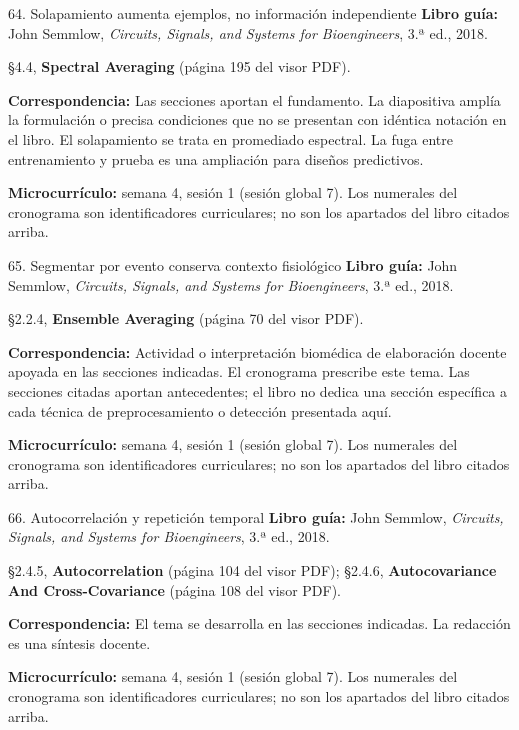 \documentclass[
  10pt,
  ignorenonframetext,
  aspectratio=169,
  spanish,
]{beamer}
\begin{document}
\begin{frame}{64. Solapamiento aumenta ejemplos, no información
independiente}
\label{solapamiento-aumenta-ejemplos-no-informaciuxf3n-independiente}
\textbf{Libro guía:} John Semmlow, \emph{Circuits, Signals, and Systems
for Bioengineers}, 3.ª ed., 2018.

§4.4, \textbf{Spectral Averaging} (página 195 del visor PDF).

\textbf{Correspondencia:} Las secciones aportan el fundamento. La
diapositiva amplía la formulación o precisa condiciones que no se
presentan con idéntica notación en el libro. El solapamiento se trata en
promediado espectral. La fuga entre entrenamiento y prueba es una
ampliación para diseños predictivos.

\textbf{Microcurrículo:} semana 4, sesión 1 (sesión global 7). Los
numerales del cronograma son identificadores curriculares; no son los
apartados del libro citados arriba.
\end{frame}

\begin{frame}{65. Segmentar por evento conserva contexto fisiológico}
\label{segmentar-por-evento-conserva-contexto-fisioluxf3gico}
\textbf{Libro guía:} John Semmlow, \emph{Circuits, Signals, and Systems
for Bioengineers}, 3.ª ed., 2018.

§2.2.4, \textbf{Ensemble Averaging} (página 70 del visor PDF).

\textbf{Correspondencia:} Actividad o interpretación biomédica de
elaboración docente apoyada en las secciones indicadas. El cronograma
prescribe este tema. Las secciones citadas aportan antecedentes; el
libro no dedica una sección específica a cada técnica de
preprocesamiento o detección presentada aquí.

\textbf{Microcurrículo:} semana 4, sesión 1 (sesión global 7). Los
numerales del cronograma son identificadores curriculares; no son los
apartados del libro citados arriba.
\end{frame}

\begin{frame}{66. Autocorrelación y repetición temporal}
\label{autocorrelaciuxf3n-y-repeticiuxf3n-temporal}
\textbf{Libro guía:} John Semmlow, \emph{Circuits, Signals, and Systems
for Bioengineers}, 3.ª ed., 2018.

§2.4.5, \textbf{Autocorrelation} (página 104 del visor PDF); §2.4.6,
\textbf{Autocovariance And Cross-Covariance} (página 108 del visor PDF).

\textbf{Correspondencia:} El tema se desarrolla en las secciones
indicadas. La redacción es una síntesis docente.

\textbf{Microcurrículo:} semana 4, sesión 1 (sesión global 7). Los
numerales del cronograma son identificadores curriculares; no son los
apartados del libro citados arriba.
\end{frame}
\end{document}
